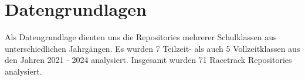 \section{Datengrundlagen}
\label{sec:Datengrundlagen}
Als Datengrundlage dienten uns die Repositories mehrerer Schulklassen aus unterschiedlichen Jahrgängen. Es wurden 7 Teilzeit- als auch 5 Vollzeitklassen aus den Jahren 2021 - 2024 analysiert. Insgesamt wurden 71 Racetrack Repositories analysiert. 



